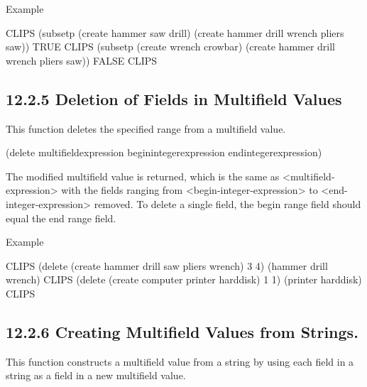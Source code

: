 \documentclass[letterpaper,10pt,english]{sphinxmanual}
\begin{document}
Example

\begin{sphinxVerbatim}[commandchars=\\\{\}]
CLIPS\PYGZgt{} (subsetp (create\PYGZdl{} hammer saw drill)
(create\PYGZdl{} hammer drill wrench pliers saw))
TRUE
CLIPS\PYGZgt{} (subsetp (create\PYGZdl{} wrench crowbar)
(create\PYGZdl{} hammer drill wrench pliers saw))
FALSE
CLIPS\PYGZgt{}
\end{sphinxVerbatim}


\subsection{12.2.5 Deletion of Fields in Multifield Values}
\label{\detokenize{actions:deletion-of-fields-in-multifield-values}}
This function deletes the specified range from a multifield value.


\begin{sphinxVerbatim}[commandchars=\\\{\}]
(delete\PYGZdl{} \PYGZlt{}multifield\PYGZhy{}expression\PYGZgt{}
  \PYGZlt{}begin\PYGZhy{}integer\PYGZhy{}expression\PYGZgt{}
  \PYGZlt{}end\PYGZhy{}integer\PYGZhy{}expression\PYGZgt{})
\end{sphinxVerbatim}

The modified multifield value is returned, which is the same as
\textless{}multifield-expression\textgreater{} with the fields ranging from
\textless{}begin-integer-expression\textgreater{} to \textless{}end-integer-expression\textgreater{} removed. To
delete a single field, the begin range field should equal the end range
field.

Example

\begin{sphinxVerbatim}[commandchars=\\\{\}]
CLIPS\PYGZgt{} (delete\PYGZdl{} (create\PYGZdl{} hammer drill saw pliers wrench) 3 4)
(hammer drill wrench)
CLIPS\PYGZgt{} (delete\PYGZdl{} (create\PYGZdl{} computer printer hard\PYGZhy{}disk) 1 1)
(printer hard\PYGZhy{}disk)
CLIPS\PYGZgt{}
\end{sphinxVerbatim}


\subsection{12.2.6 Creating Multifield Values from Strings.}
\label{\detokenize{actions:creating-multifield-values-from-strings}}
This function constructs a multifield value from a string by using each
field in a string as a field in a new multifield value.
\end{document}
